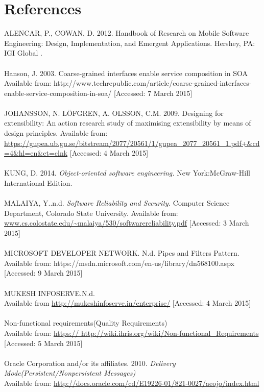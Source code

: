 \documentclass[a4paper]{article}
\begin{document}
\section{References}

ALENCAR, P., COWAN, D. 2012. Handbook of Research on Mobile Software Engineering: Design, Implementation, and Emergent Applications. Hershey, PA: IGI Global .
\\
\\Hanson, J. 2003. Coarse-grained interfaces enable service composition in SOA
\\Available from: http://www.techrepublic.com/article/coarse-grained-interfaces-enable-service-composition-in-soa/
[Accessed: 7 March 2015]
\\
\\JOHANSSON, N. LÖFGREN, A. OLSSON, C.M. 2009. Designing for extensibility: An action research study of maximising extensibility by means of design principles.
Available from: \url{https://gupea.ub.gu.se/bitstream/2077/20561/1/gupea_2077_20561_1.pdf+&cd=4&hl=en&ct=clnk}
[Accessed: 4 March 2015]
\\
\\KUNG, D. 2014. \textit{Object-oriented software engineering.} New York:McGraw-Hill International Edition.
\\
\\MALAIYA, Y..n.d. \textit{Software Reliability and Security.} Computer Science Department, Colorado State University. 
Available from: \url{www.cs.colostate.edu/~malaiya/530/softwarereliability​.pdf}
[Accessed: 3 March 2015]
\\
\\ MICROSOFT DEVELOPER NETWORK. N.d. Pipes and Filters Pattern.
Available from: https://msdn.microsoft.com/en-us/library/dn568100.aspx
[Accessed: 9 March 2015]
\\
\\MUKESH INFOSERVE.N.d.
\\Available from \url{http://mukeshinfoserve.in/enterprise/}
[Accessed: 4 March 2015]
\\
\\Non-functional requirements(Quality Requirements)
\\Available from:  \url{https:// http://wiki.ihris.org/wiki/Non-functional_Requirements}
[Accessed: 5 March 2015]
\\
\\Oracle Corporation and/or its affiliates. 2010. \textit{Delivery Mode(Persistent/Nonpersistent Messages)}
\\Available from:  \url{http://docs.oracle.com/cd/E19226-01/821-0027/aeojo/index.html}
\end{document}
